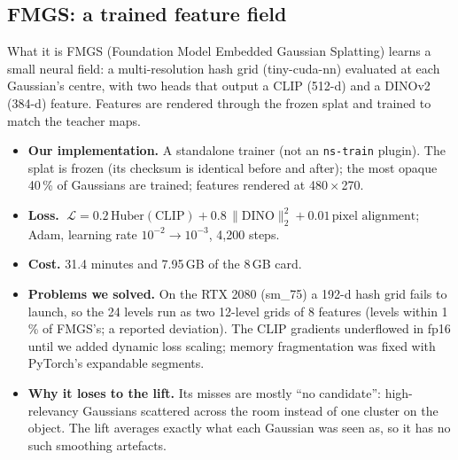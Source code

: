 \documentclass[11pt,a4paper]{article}
\begin{document}
\subsection{FMGS: a trained feature field}\label{sec:fmgs}
\begin{tech}{What it is}
FMGS (Foundation Model Embedded Gaussian Splatting) learns a small neural field: a multi-resolution hash
grid (tiny-cuda-nn) evaluated at each Gaussian's centre, with two heads that output a CLIP (512-d) and a
DINOv2 (384-d) feature. Features are rendered through the frozen splat and trained to match the teacher
maps.
\end{tech}
\begin{itemize}
  \item \textbf{Our implementation.} A standalone trainer (not an \texttt{ns-train} plugin). The splat is
    frozen (its checksum is identical before and after); the most opaque 40\,\% of Gaussians are trained;
    features rendered at 480\,$\times$\,270.
  \item \textbf{Loss.} $\;\mathcal{L} = 0.2\,\mathrm{Huber}(\text{CLIP}) + 0.8\,\lVert\text{DINO}\rVert_2^2
    + 0.01\,\text{pixel alignment}$; Adam, learning rate $10^{-2}\!\to\!10^{-3}$, 4{,}200 steps.
  \item \textbf{Cost.} 31.4 minutes and 7.95\,GB of the 8\,GB card.
  \item \textbf{Problems we solved.} On the RTX 2080 (sm\_75) a 192-d hash grid fails to launch, so the 24
    levels run as two 12-level grids of 8 features (levels within 1\,\% of FMGS's; a reported deviation).
    The CLIP gradients underflowed in fp16 until we added dynamic loss scaling; memory fragmentation was
    fixed with PyTorch's expandable segments.
  \item \textbf{Why it loses to the lift.} Its misses are mostly ``no candidate'': high-relevancy Gaussians
    scattered across the room instead of one cluster on the object. The lift averages exactly what each
    Gaussian was seen as, so it has no such smoothing artefacts.
\end{itemize}
\end{document}
